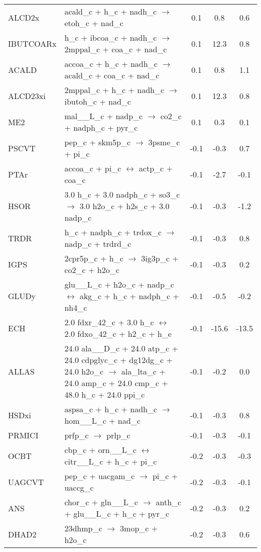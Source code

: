 \begin{longtable}{lp{}ccc}
ALCD2x	&	acald\_c + h\_c + nadh\_c $\rightarrow$ etoh\_c + nad\_c	&	0.1	&	0.8	&	0.6	\\
IBUTCOARx	&	h\_c + ibcoa\_c + nadh\_c $\rightarrow$ 2mppal\_c + coa\_c + nad\_c	&	0.1	&	12.3	&	0.8	\\
ACALD	&	accoa\_c + h\_c + nadh\_c $\rightarrow$ acald\_c + coa\_c + nad\_c	&	0.1	&	0.8	&	1.1	\\
ALCD23xi	&	2mppal\_c + h\_c + nadh\_c $\rightarrow$ ibutoh\_c + nad\_c	&	0.1	&	12.3	&	0.8	\\
ME2	&	mal\_\_L\_c + nadp\_c $\rightarrow$ co2\_c + nadph\_c + pyr\_c	&	0.1	&	0.3	&	0.1	\\
PSCVT	&	pep\_c + skm5p\_c $\rightarrow$ 3psme\_c + pi\_c	&	-0.1	&	-0.3	&	0.7	\\
PTAr	&	accoa\_c + pi\_c $\leftrightarrow$ actp\_c + coa\_c	&	-0.1	&	-2.7	&	-0.1	\\
    HSOR	&	3.0 h\_c + 3.0 nadph\_c + so3\_c $\rightarrow$ 3.0 h2o\_c + h2s\_c + 3.0 nadp\_c	&	-0.1	&	-0.3	&	-1.2	\\
TRDR	&	h\_c + nadph\_c + trdox\_c $\rightarrow$ nadp\_c + trdrd\_c	&	-0.1	&	-0.3	&	0.8	\\
IGPS	&	2cpr5p\_c + h\_c $\rightarrow$ 3ig3p\_c + co2\_c + h2o\_c	&	-0.1	&	-0.3	&	0.2	\\
GLUDy	&	glu\_\_L\_c + h2o\_c + nadp\_c $\leftrightarrow$ akg\_c + h\_c + nadph\_c + nh4\_c	&	-0.1	&	-0.5	&	-0.2	\\
ECH	&	2.0 fdxr\_42\_c + 3.0 h\_c $\leftrightarrow$ 2.0 fdxo\_42\_c + h2\_c + h\_e	&	-0.1	&	-15.6	&	-13.5	\\
ALLAS	&	24.0 ala\_\_D\_c + 24.0 atp\_c + 24.0 cdpglyc\_c + dg12dg\_c + 24.0 h2o\_c $\rightarrow$ ala\_lta\_c + 24.0 amp\_c + 24.0 cmp\_c + 48.0 h\_c + 24.0 ppi\_c	&	-0.1	&	-0.2	&	0.0	\\
HSDxi	&	aspsa\_c + h\_c + nadh\_c $\rightarrow$ hom\_\_L\_c + nad\_c	&	-0.1	&	-0.3	&	0.8	\\
PRMICI	&	prfp\_c $\rightarrow$ prlp\_c	&	-0.1	&	-0.3	&	-0.1	\\
OCBT	&	cbp\_c + orn\_\_L\_c $\leftrightarrow$ citr\_\_L\_c + h\_c + pi\_c	&	-0.2	&	-0.3	&	-0.3	\\
UAGCVT	&	pep\_c + uacgam\_c $\rightarrow$ pi\_c + uaccg\_c	&	-0.2	&	-0.3	&	-0.1	\\
ANS	&	chor\_c + gln\_\_L\_c $\rightarrow$ anth\_c + glu\_\_L\_c + h\_c + pyr\_c	&	-0.2	&	-0.3	&	0.2	\\
DHAD2	&	23dhmp\_c $\rightarrow$ 3mop\_c + h2o\_c	&	-0.2	&	-0.3	&	0.6	\\

\end{longtable}
